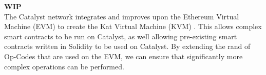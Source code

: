 \textbf{WIP} \\

The Catalyst network integrates and improves upon the Ethereum Virtual Machine (EVM) to create the Kat Virtual Machine (KVM) \cite{KVM}. This allows complex smart contracts to be run on Catalyst, as well allowing pre-existing smart contracts written in Solidity to be used on Catalyst. By extending the rand of Op-Codes that are used on the EVM, we can ensure that significantly more complex operations can be performed.